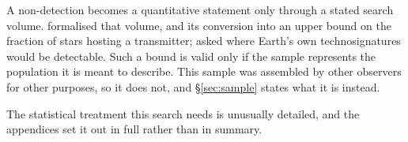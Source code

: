 A non-detection becomes a quantitative statement only through a stated
search volume. \citet{Wright2018} formalised that volume, and
\citet{Margot2023} its conversion into an upper bound on the fraction of
stars hosting a transmitter; \citet{EarthDetectingEarth2025} asked where
Earth's own technosignatures would be detectable. Such a bound is valid
only if the sample represents the population it is meant to describe.
This sample was assembled by other observers for other purposes, so it
does not, and \S\ref{sec:sample} states what it is instead.

The statistical treatment this search needs is unusually detailed, and the
appendices set it out in full rather than in summary.

